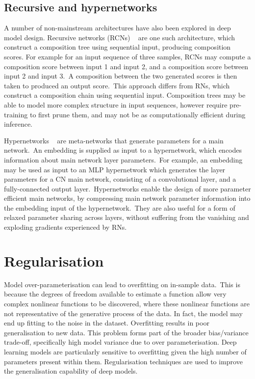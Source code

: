 \subsection{Recursive and hypernetworks} A number of non-mainstream architectures have also been explored in deep model design. Recursive networks (RCNs) \unskip ~\citep{pollack1990recursive} are one such architecture, which construct a composition tree using sequential input, producing composition scores. For example for an input sequence of three samples, RCNs may compute a composition score between input 1 and input 2, and a composition score between input 2 and input 3.\ A composition between the two generated scores is then taken to produced an output score.\ This approach differs from RNs, which construct a composition chain using sequential input. Composition trees may be able to model more complex structure in input sequences, however require pre-training to first prune them, and may not be as computationally efficient during inference. \par

\noindent Hypernetworks \unskip~\citep{ha2016hypernetworks} are meta-networks that generate parameters for a main network.\ An embedding is supplied as input to a hypernetwork, which encodes information about main network layer parameters.\ For example, an embedding may be used as input to an MLP hypernetwork which generates the layer parameters for a CN main network, consisting of a convolutional layer, and a fully-connected output layer.\ Hypernetworks enable the design of more parameter efficient main networks, by compressing main network parameter information into the embedding input of the hypernetwork.\ They are also useful for a form of relaxed parameter sharing across layers, without suffering from the vanishing and exploding gradients experienced by RNs. 



\section{Regularisation}

Model over-parameterisation can lead to overfitting on in-sample data.\ This is because the degrees of freedom available to estimate a function allow very complex nonlinear functions to be discovered, where these nonlinear functions are not representative of the generative process of the data. In fact, the model may end up fitting to the noise in the dataset. Overfitting results in poor generalisation to new data. This problem forms part of the broader bias/variance trade-off, specifically high model variance due to over parameterisation. Deep learning models are particularly sensitive to overfitting given the high number of parameters present within them. Regularisation techniques are used to improve the generalisation capability of deep models. \par


